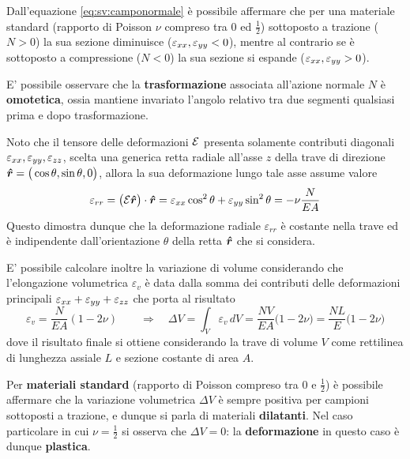 	\begin{osservazione}
		Dall'equazione \ref{eq:sv:camponormale} è possibile affermare che per una materiale standard (rapporto di Poisson $\nu$ compreso tra $0$ ed $\frac 1 2$) sottoposto a trazione ($N> 0$) la sua sezione diminuisce ($\varepsilon_{xx}, \varepsilon_{yy} < 0$), mentre al contrario se è sottoposto a compressione ($N<0$) la sua sezione si espande ($\varepsilon_{xx},\varepsilon_{yy} > 0$). 
	\end{osservazione}
	\begin{concetto}
		E' possibile osservare che la \textbf{trasformazione} associata all'azione normale $N$ è \textbf{omotetica}, ossia mantiene invariato l'angolo relativo tra due segmenti qualsiasi prima e dopo trasformazione.		
	\end{concetto}
	\begin{dimostrazione}
		Noto che il tensore delle deformazioni $\mathcal E$ presenta solamente contributi diagonali $\varepsilon_{xx},\varepsilon_{yy},\varepsilon_{zz}$, scelta una generica retta radiale all'asse $z$ della trave di direzione $\boldsymbol{\hat{r}}= \big(\cos\theta,\sin\theta,0\big)$, allora la sua deformazione lungo tale asse assume valore
		\[ \varepsilon_{rr} = \big(\mathcal E \boldsymbol{\hat{r}}\big) \cdot \boldsymbol{\hat{r}} = \varepsilon_{xx} \cos^2\theta + \varepsilon_{yy}\sin^2\theta = - \nu \frac N{EA} \] 
		Questo dimostra dunque che la deformazione radiale $\varepsilon_{rr}$ è costante nella trave ed è indipendente dall'orientazione $\theta$ della retta $\boldsymbol{\hat{r}}$ che si considera.
	\end{dimostrazione}

	E' possibile calcolare inoltre la variazione di volume considerando che l'elongazione volumetrica $\varepsilon_v$ è data dalla somma dei contributi delle deformazioni principali $\varepsilon_{xx} + \varepsilon_{yy} + \varepsilon_{zz}$ che porta al risultato
	\[ \varepsilon_v = \frac N{EA} ( 1 -2\nu) \qquad \Rightarrow \quad \Delta V = \int_V \varepsilon_v \, dV = \frac{NV}{EA} \big(1-2\nu\big) = \frac {NL} E \big(1-2\nu\big) \]
	dove il risultato finale si ottiene considerando la trave di volume $V$ come rettilinea di lunghezza assiale $L$ e sezione costante di area $A$.
	
	\begin{osservazione}
		Per \textbf{materiali standard} (rapporto di Poisson compreso tra 0 e $\frac 1 2$) è possibile affermare che la variazione volumetrica $\Delta V$ è sempre positiva per campioni sottoposti a trazione, e dunque si parla di materiali \textbf{dilatanti}. Nel caso particolare in cui $\nu = \frac 1 2$ si osserva che $\Delta V = 0$: la \textbf{deformazione} in questo caso è dunque \textbf{plastica}.
	\end{osservazione}

